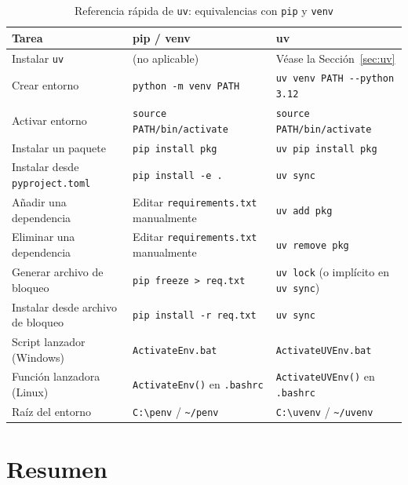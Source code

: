 \begin{table}[h]
\centering
\caption{Referencia rápida de \texttt{uv}: equivalencias con \texttt{pip} y \texttt{venv}}
\label{tab:uv-cheatsheet}
\begin{tabular}{@{}p{}p{}p{}@{}}
\toprule
\textbf{Tarea} & \textbf{pip / venv} & \textbf{uv} \\
\midrule
Instalar \texttt{uv}
  & (no aplicable)
  & Véase la Sección~\ref{sec:uv} \\[4pt]
Crear entorno
  & \texttt{python -m venv PATH}
  & \texttt{uv venv PATH -{}-python 3.12} \\[4pt]
Activar entorno
  & \texttt{source PATH/bin/activate}
  & \texttt{source PATH/bin/activate} \\[4pt]
Instalar un paquete
  & \texttt{pip install pkg}
  & \texttt{uv pip install pkg} \\[4pt]
Instalar desde \texttt{pyproject.toml}
  & \texttt{pip install -e .}
  & \texttt{uv sync} \\[4pt]
Añadir una dependencia
  & Editar \texttt{requirements.txt} manualmente
  & \texttt{uv add pkg} \\[4pt]
Eliminar una dependencia
  & Editar \texttt{requirements.txt} manualmente
  & \texttt{uv remove pkg} \\[4pt]
Generar archivo de bloqueo
  & \texttt{pip freeze > req.txt}
  & \texttt{uv lock} (o implícito en \texttt{uv sync}) \\[4pt]
Instalar desde archivo de bloqueo
  & \texttt{pip install -r req.txt}
  & \texttt{uv sync} \\[4pt]
Script lanzador (Windows)
  & \texttt{ActivateEnv.bat}
  & \texttt{ActivateUVEnv.bat} \\[4pt]
Función lanzadora (Linux)
  & \texttt{ActivateEnv()} en \texttt{.bashrc}
  & \texttt{ActivateUVEnv()} en \texttt{.bashrc} \\[4pt]
Raíz del entorno
  & \texttt{C:\textbackslash penv} / \texttt{\textasciitilde/penv}
  & \texttt{C:\textbackslash uvenv} / \texttt{\textasciitilde/uvenv} \\
\bottomrule
\end{tabular}
\end{table}

\section{Resumen}
\label{sec:summary}

